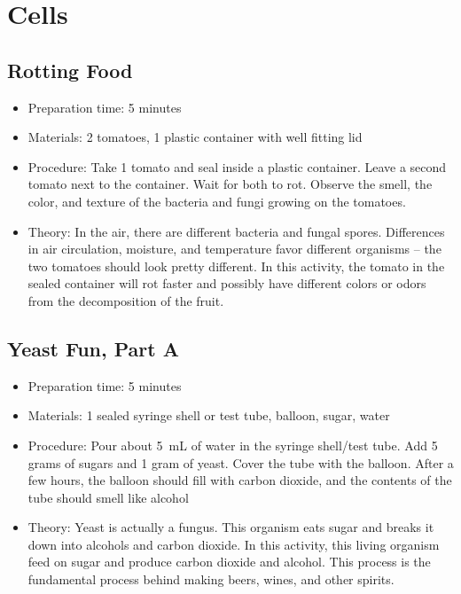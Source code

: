 \section{Cells}
\subsection{Rotting Food}
\begin{itemize}
\item{Preparation time: 5 minutes}
\item{Materials: 2 tomatoes, 1 plastic container with well fitting lid}
\item{Procedure: Take 1 tomato and seal inside a plastic container. Leave a second tomato next to the container. Wait for both to rot. Observe the smell, the color, and texture of the bacteria and fungi growing on the tomatoes.}
\item{Theory: In the air, there are different bacteria and fungal spores. Differences in air circulation, moisture, and temperature favor different organisms -- the two tomatoes should look pretty different. In this activity, the tomato in the sealed container will rot faster and possibly have different colors or odors from the decomposition of the fruit.}
\end{itemize}


\subsection{Yeast Fun, Part A}
\begin{itemize}
\item{Preparation time: 5 minutes}
\item{Materials: 1 sealed syringe shell or test tube, balloon, sugar, water}
\item{Procedure: Pour about 5~mL of water in the syringe shell\slash test tube. Add 5 grams of sugars and 1 gram of yeast. Cover the tube with the balloon. After a few hours, the balloon should fill with carbon dioxide, and the contents of the tube should smell like alcohol}
\item{Theory: Yeast is actually a fungus. This organism eats sugar and breaks it down into alcohols and carbon dioxide. In this activity, this living organism feed on sugar and produce carbon dioxide and alcohol. This process is the fundamental process behind making beers, wines, and other spirits.}
\end{itemize}



